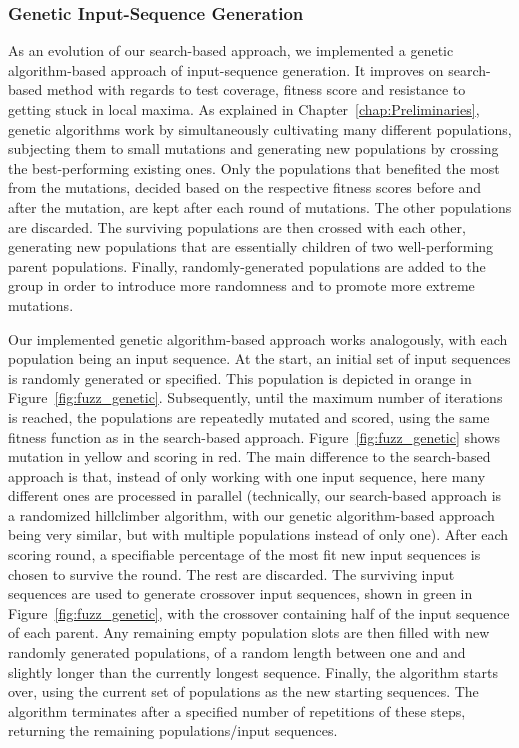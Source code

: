 \subsubsection{Genetic Input-Sequence Generation} \label{subsubsec:genetic}
As an evolution of our search-based approach, we implemented a genetic algorithm-based approach of input-sequence generation. It improves on search-based method with regards to test coverage, fitness score and resistance to getting stuck in local maxima. As explained in Chapter~\ref{chap:Preliminaries}, genetic algorithms work by simultaneously cultivating many different populations, subjecting them to small mutations and generating new populations by crossing the best-performing existing ones. Only the populations that benefited the most from the mutations, decided based on the respective fitness scores before and after the mutation, are kept after each round of mutations. The other populations are discarded. The surviving populations are then crossed with each other, generating new populations that are essentially children of two well-performing parent populations. Finally, randomly-generated populations are added to the group in order to introduce more randomness and to promote more extreme mutations. 

Our implemented genetic algorithm-based approach works analogously, with each population being an input sequence. At the start, an initial set of input sequences is randomly generated or specified. This population is depicted in orange in Figure~\ref{fig:fuzz_genetic}. Subsequently, until the maximum number of iterations is reached, the populations are repeatedly mutated and scored, using the same fitness function as in the search-based approach. Figure~\ref{fig:fuzz_genetic} shows mutation in yellow and scoring in red. The main difference to the search-based approach is that, instead of only working with one input sequence, here many different ones are processed in parallel (technically, our search-based approach is a randomized hillclimber algorithm, with our genetic algorithm-based approach being very similar, but with multiple populations instead of only one). After each scoring round, a specifiable percentage of the most fit new input sequences is chosen to survive the round. The rest are discarded. The surviving input sequences are used to generate crossover input sequences, shown in green in Figure~\ref{fig:fuzz_genetic}, with the crossover containing half of the input sequence of each parent. Any remaining empty population slots are then filled with new randomly generated populations, of a random length between one and and slightly longer than the currently longest sequence. Finally, the algorithm starts over, using the current set of populations as the new starting sequences. The algorithm terminates after a specified number of repetitions of these steps, returning the remaining populations/input sequences. \\

